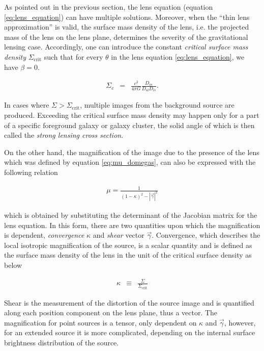 \documentclass[a4wide,12pt]{book}
\begin{document}
{%
As pointed out in the previous section, the lens equation (equation \ref{eq:lens_equation}) can have multiple solutions. Moreover, when the ``thin lens approximation'' is valid, the surface mass density of the lens, i.e. the projected mass of the lens on the lens plane, determines the severity of the gravitational lensing case. Accordingly, one can introduce the constant \emph{critical surface mass density} $\Sigma_{\mathrm{crit}}$ such that for every $\theta$ in the lens equation \ref{eq:lens_equation}, we have $\beta = 0$.

\begin{eqnarray}
\label{eq:Sigma_crit}
\Sigma_c &=& \frac{c^2}{4 \pi G}\frac{D_{os}}{D_{ol} D_{ls}}.
\end{eqnarray}

In cases where $\Sigma > \Sigma_{\mathrm{crit}}$, multiple images from the background source are produced. Exceeding the critical surface mass density may happen only for a part of a specific foreground galaxy or galaxy cluster, the solid angle of which is then called the \emph{strong lensing cross section}. 

On the other hand, the magnification of the image due to the presence of the lens which was defined by equation \ref{eq:mu_domegas}, can also be expressed with the following relation 

\begin{eqnarray}
\label{eq:mu_kappa_gamma}
\mu = \frac{1}{(1 - \kappa)^2 - |\vec{\gamma}|^2}
\end{eqnarray}

which is obtained by substituting the determinant of the Jacobian matrix for the lens equation. In this form, there are two quantities upon which the magnification is dependent, \emph{convergence} $\kappa$ and \emph{shear} vector $\vec{\gamma}$. Convergence, which describes the local isotropic magnification of the source, is a scalar quantity and is defined as the surface mass density of the lens in the unit of the critical surface density as below

\begin{eqnarray}
\label{eq:convergence}
\kappa &\equiv& \frac{\Sigma}{\Sigma_{\mathrm{crit}}}
\end{eqnarray}

 Shear is the measurement of the distortion of the source image and is quantified along each position component on the lens plane, thus a vector. The magnification for point sources is a tensor, only dependent on $\kappa$ and $\vec{\gamma}$, however, for an extended source it is more complicated, depending on the internal surface brightness distribution of the source.

}
\end{document}
